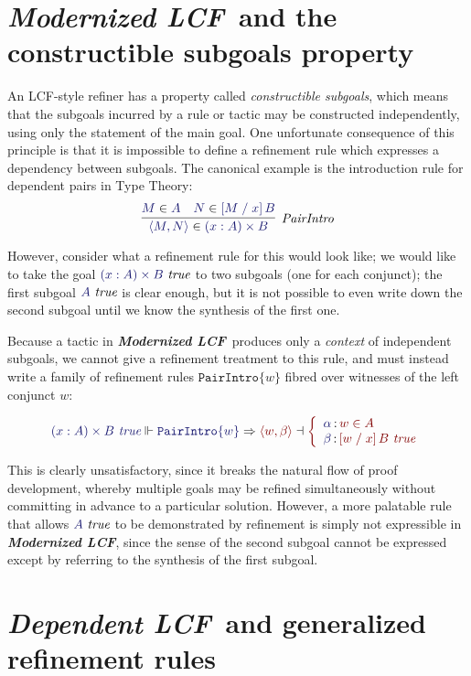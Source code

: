 \documentclass[11pt]{article}
\theoremstyle{definition}
\theoremstyle{remark}
\numberwithin{equation}{section}
\def\InputModeColorName{MidnightBlue}
\def\OutputModeColorName{Maroon}
\newcommand\InputMode[1]{{\color{\InputModeColorName}{#1}}}
\newcommand\OutputMode[1]{{\color{\OutputModeColorName}{#1}}}
\newcommand\Tuple[1]{\left\langle#1\right\rangle}
\newcommand\OSG[2]{\InputMode{#1}\,{\color{Black}:}\,\OutputMode{#2}}
\newcommand\Refine[4]{\InputMode{#1}\Vdash\InputMode{#2}\Rightarrow\OutputMode{#4}\dashv\OutputMode{#3}}
\newcommand\Member[2]{\InputMode{#1}\in\InputMode{#2}}
\newcommand\MemberUnmoded[2]{#1\in #2}
\newcommand\IsTrue[1]{\InputMode{#1}\ \textit{true}}
\newcommand\IsTrueUnmoded[1]{#1\ \textit{true}}
\newcommand\DProdIntroRule[1]{\mathtt{PairIntro}\{#1\}}
\newcommand\TyDProd[3]{(#2:#1) \times #3}
\newcommand\Subst[3]{\left[#1\;/\;#2\right]#3}
\newcommand\ModLCF{\textbf{\emph{Modernized LCF}}}
\newcommand\DepLCF{\textbf{\emph{Dependent LCF}}}
\begin{document}
\section{\ModLCF\ and the constructible subgoals property}

An LCF-style refiner has a property called \emph{constructible subgoals}, which
means that the subgoals incurred by a rule or tactic may be constructed
independently, using only the statement of the main goal. One unfortunate
consequence of this principle is that it is impossible to define a refinement
rule which expresses a dependency between subgoals. The canonical example is
the introduction rule for dependent pairs in Type Theory:
\[
  \infer[\textit{PairIntro}]{
    \Member{\Tuple{M,N}}{\TyDProd{A}{x}{B}}
  }{
    \Member{M}{A} &
    \Member{N}{\Subst{M}{x}{B}}
  }
\]

However, consider what a refinement rule for this would look like; we would
like to take the goal $\IsTrue{\TyDProd{A}{x}{B}}$ to two subgoals (one for
each conjunct); the first subgoal $\IsTrue{A}$ is clear enough, but it is not
possible to even write down the second subgoal until we know the synthesis of
the first one.

Because a tactic in \ModLCF\ produces only a \emph{context} of independent
subgoals, we cannot give a refinement treatment to this rule, and must
instead write a family of refinement rules $\DProdIntroRule{w}$ fibred over
witnesses of the left conjunct $w$:

\[
  \Refine{\IsTrueUnmoded{\TyDProd{A}{x}{B}}}{\DProdIntroRule{w}}{%
    \left\{\begin{array}{l}
      \OSG{\alpha}{\MemberUnmoded{w}{A}}\\
      \OSG{\beta}{\IsTrueUnmoded{\Subst{w}{x}{B}}}
    \end{array}\right.
  }{\Tuple{w,\beta}}
\]

This is clearly unsatisfactory, since it breaks the natural flow of proof
development, whereby multiple goals may be refined simultaneously without
committing in advance to a particular solution. However, a more palatable
rule that allows $\IsTrue{A}$ to be demonstrated by refinement is
simply not expressible in \ModLCF, since the sense of the second subgoal cannot
be expressed except by referring to the synthesis of the first subgoal.

\section{\DepLCF\ and generalized refinement rules}
\end{document}
